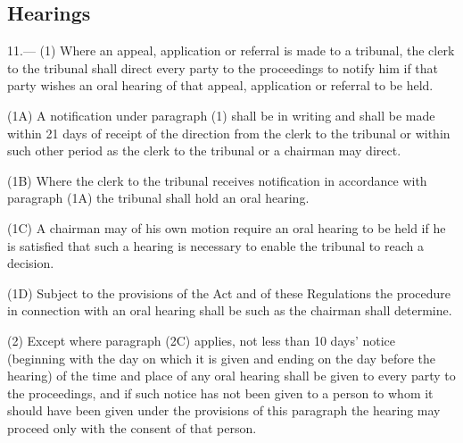 \documentclass[a4paper]{article}
\begin{document}
\subsection[11. Hearings]{Hearings}

11.—%
%
(1) Where an 
appeal, application or referral  %
is made to a tribunal, the clerk to the tribunal shall direct every party to the proceedings to notify him if that party wishes an oral hearing of that 
appeal, application or referral  %
to be held.

(1A) A notification under paragraph (1) shall be in writing and shall be made within 21 days of receipt of the direction from the clerk to the tribunal or within such other period as the clerk to the tribunal or a chairman may direct.

(1B) Where the clerk to the tribunal receives notification in accordance with paragraph (1A) the tribunal shall hold an oral hearing.

(1C) A chairman may of his own motion require an oral hearing to be held if he is satisfied that such a hearing is necessary to enable the tribunal to reach a decision.

(1D) Subject to the provisions of the Act and of these Regulations the procedure in connection with an oral hearing shall be such as the chairman shall determine.

(2) 
Except where paragraph (2C) applies,  %
not less than 10 days' notice (beginning with the day on which it is given and ending on the day before the hearing) of 
the time and place of any oral hearing  %
shall be given to every party to the proceedings, and if such notice has not been given to a person to whom it should have been given under the provisions of this paragraph the hearing may proceed only with the consent of that person.
\end{document}

